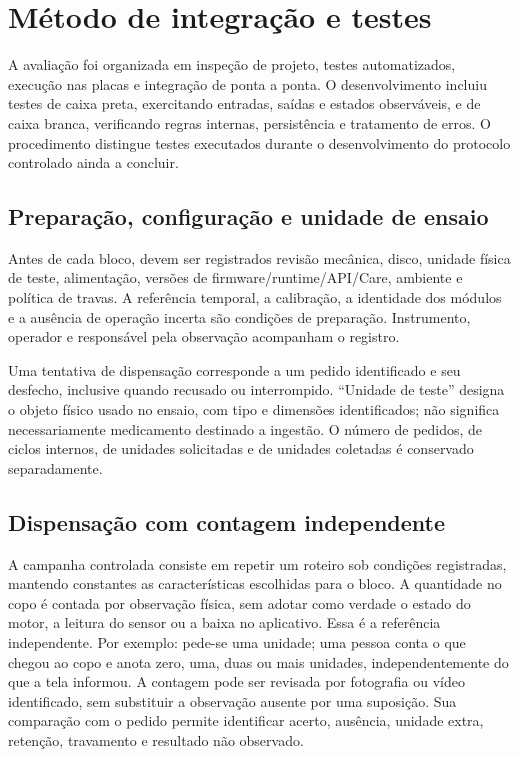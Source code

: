 \section{Método de integração e testes}\label{cap:testes}
A avaliação foi organizada em inspeção de projeto, testes automatizados, execução nas placas e integração de ponta a ponta. O desenvolvimento incluiu testes de caixa preta, exercitando entradas, saídas e estados observáveis, e de caixa branca, verificando regras internas, persistência e tratamento de erros. O procedimento distingue testes executados durante o desenvolvimento do protocolo controlado ainda a concluir.

\subsection{Preparação, configuração e unidade de ensaio}
Antes de cada bloco, devem ser registrados revisão mecânica, disco, unidade física de teste, alimentação, versões de firmware/runtime/API/Care, ambiente e política de travas. A referência temporal, a calibração, a identidade dos módulos e a ausência de operação incerta são condições de preparação. Instrumento, operador e responsável pela observação acompanham o registro.

Uma tentativa de dispensação corresponde a um pedido identificado e seu desfecho, inclusive quando recusado ou interrompido. ``Unidade de teste'' designa o objeto físico usado no ensaio, com tipo e dimensões identificados; não significa necessariamente medicamento destinado a ingestão. O número de pedidos, de ciclos internos, de unidades solicitadas e de unidades coletadas é conservado separadamente.

\subsection{Dispensação com contagem independente}
A campanha controlada consiste em repetir um roteiro sob condições registradas, mantendo constantes as características escolhidas para o bloco. A quantidade no copo é contada por observação física, sem adotar como verdade o estado do motor, a leitura do sensor ou a baixa no aplicativo. Essa é a referência independente. Por exemplo: pede-se uma unidade; uma pessoa conta o que chegou ao copo e anota zero, uma, duas ou mais unidades, independentemente do que a tela informou. A contagem pode ser revisada por fotografia ou vídeo identificado, sem substituir a observação ausente por uma suposição. Sua comparação com o pedido permite identificar acerto, ausência, unidade extra, retenção, travamento e resultado não observado.

